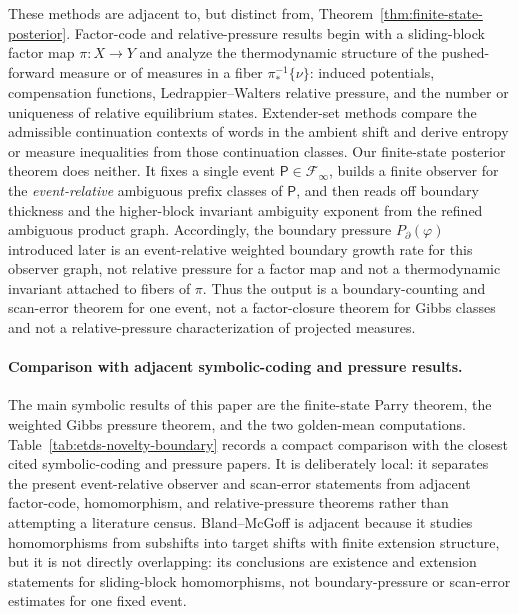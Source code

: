 \documentclass{etds}%
\numberwithin{equation}{section}
\theoremstyle{plain}
\theoremstyle{definition}
\theoremstyle{remark}
\begin{document}
These methods are adjacent to, but distinct from,
Theorem~\ref{thm:finite-state-posterior}.  Factor-code and relative-pressure
results begin with a sliding-block factor map $\pi:X\to Y$ and analyze the
thermodynamic structure of the pushed-forward measure or of measures in a
fiber $\pi_*^{-1}\{\nu\}$: induced potentials, compensation functions,
Ledrappier--Walters relative pressure, and the number or uniqueness of
relative equilibrium states.  Extender-set methods compare the admissible
continuation contexts of words in the ambient shift and derive entropy or
measure inequalities from those continuation classes.  Our finite-state
posterior theorem does neither.  It fixes a single event
$\mathsf{P}\in\mathcal{F}_\infty$, builds a finite observer for the
\emph{event-relative} ambiguous prefix classes of $\mathsf{P}$, and then
reads off boundary thickness and the higher-block invariant ambiguity exponent
from the refined ambiguous product graph.  Accordingly, the boundary pressure
$P_\partial(\varphi)$ introduced later is an event-relative weighted boundary
growth rate for this observer graph, not relative pressure for a factor map
and not a thermodynamic invariant attached to fibers of $\pi$.  Thus the
output is a boundary-counting and scan-error theorem for one event, not a
factor-closure theorem for Gibbs classes and not a relative-pressure
characterization of projected measures.

\paragraph{Comparison with adjacent symbolic-coding and pressure results.}
The main symbolic results of this paper are the finite-state Parry theorem,
the weighted Gibbs pressure theorem, and the two golden-mean computations.
Table~\ref{tab:etds-novelty-boundary} records a compact comparison with the
closest cited symbolic-coding and pressure papers.  It is deliberately local:
it separates the present event-relative observer and scan-error statements
from adjacent factor-code, homomorphism, and relative-pressure theorems rather
than attempting a literature census.  Bland--McGoff
\cite{BlandMcGoff2025} is adjacent because it studies homomorphisms from
subshifts into target shifts with finite extension structure, but it is not
directly overlapping: its conclusions are existence and extension statements
for sliding-block homomorphisms, not boundary-pressure or scan-error estimates
for one fixed event.
\end{document}
